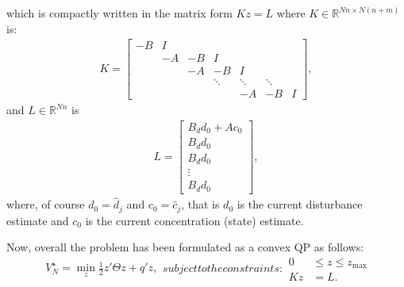 \documentclass[12pt]{report}
\renewcommand{\Re}{\mathbb{R}}
\begin{document}
which is compactly written in the matrix form $Kz = L$ where $K\in\Re^{Nn\times N(n+m)}$ is:
\begin{align}
K=\left[\begin{array}{ccccccc}
-B & I\\
& -A & -B &I\\
&& -A & -B &I\\
&&&\ddots & \ddots & \ddots\\
&&&&-A&-B&I
\end{array}\right],
\end{align}
and $L\in \Re^{Nn}$ is
\begin{align}
L=\left[
\begin{array}{c}
B_d d_0 + Ac_0\\
B_d d_0\\
B_d d_0\\
\vdots\\
B_d d_0
\end{array}\right],
\end{align}
where, of course $d_0=\hat{d}_j$ and $c_0=\hat{c}_j$, that is
$d_0$ is the current disturbance estimate and $c_0$ is the current
concentration (state) estimate.

Now, overall the problem has been formulated as a convex QP as follows:
\begin{subequations}
\begin{align}
V_N^\star = \min_{z} \frac{1}{2}z'\Theta z + q'z,
\end{align}
subject to the constraints:
\begin{align}
0 &\leq z \leq z_{\max}\label{eq:z-bound}\\
Kz &= L.
\end{align}
\end{subequations}
\end{document}
